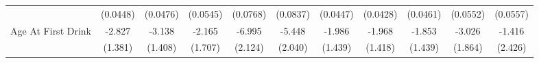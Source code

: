 {\begin{tabular}{l*{10}{c}}
            &    (0.0448)         &    (0.0476)         &    (0.0545)         &    (0.0768)         &    (0.0837)         &    (0.0447)         &    (0.0428)         &    (0.0461)         &    (0.0552)         &    (0.0557)         \\
\addlinespace
Age At First Drink&      -2.827\sym{*}  &      -3.138\sym{*}  &      -2.165         &      -6.995\sym{***}&      -5.448\sym{**} &      -1.986         &      -1.968         &      -1.853         &      -3.026         &      -1.416         \\
            &     (1.381)         &     (1.408)         &     (1.707)         &     (2.124)         &     (2.040)         &     (1.439)         &     (1.418)         &     (1.439)         &     (1.864)         &     (2.426)         \\
\bottomrule
\end{tabular}
}
